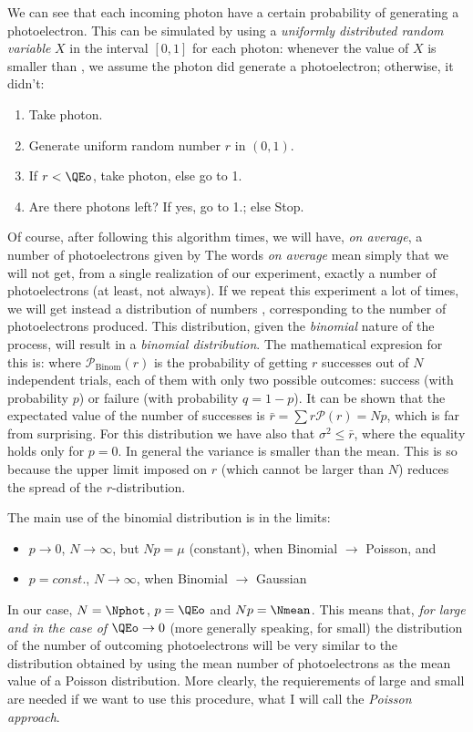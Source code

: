 We can see that each incoming photon have a certain probability \QEo
of generating a photoelectron. This can be simulated by using a
\emph{uniformly distributed random variable} $X$ in the interval
$[0,1]$ for each photon: whenever the value of $X$ is smaller than
\QEo, we assume the photon did generate a photoelectron; otherwise, it
didn't:
%
\begin{enumerate}
\item Take photon.
\item Generate uniform random number $r$ in $(0,1)$.
\item If $r < \QEo$, take photon, else go to 1.
\item Are there photons left? If yes, go to 1.; else Stop.
\end{enumerate}
%
Of course, after following this algorithm \Nphot times, we will have,
\emph{on average}, a number of photoelectrons given by
%
\nmeaneq
%
The words \emph{on average} mean simply that we will not get, from a
single realization of our experiment, exactly a number \Nmean of
photoelectrons (at least, not always). If we repeat this experiment a
lot of times, we will get instead a distribution of numbers \Ntrial,
corresponding to the number of photoelectrons produced. This
distribution, given the \emph{binomial} nature of the process, will
result in a \emph{binomial distribution}. The mathematical expresion
for this is:
%
\binomeq
%
where $\mathcal{P}_{\mathrm{Binom}}(r)$ is the probability of getting
$r$ successes out of $N$ independent trials, each of them with only
two possible outcomes: success (with probability $p$) or failure (with
probability $q=1-p$). It can be shown that the expectated value of the
number of successes is $\bar{r}=\sum r\mathcal{P}(r) = N p$, which is
far from surprising. For this distribution we have also that
$\sigma^{2} \leq \bar{r}$, where the equality holds only for $p=0$. In
general the variance is smaller than the mean. This is so because the
upper limit imposed on $r$ (which cannot be larger than $N$) reduces
the spread of the $r$-distribution.

\noutqesmallfig

\varquotfig

The main use of the binomial distribution is in the limits:
%
\begin{itemize}
\item $p\rightarrow 0$, $N\rightarrow\infty$, but $Np=\mu$ (constant),
  when Binomial $\longrightarrow$ Poisson, and
\item $p=const.$, $N\rightarrow\infty$, when Binomial
  $\longrightarrow$ Gaussian
\end{itemize}
%
In our case, $N=\Nphot$, $p=\QEo$ and $Np=\Nmean$.  This means that,
\emph{for \Nphot large and in the case of $\QEo\rightarrow 0$} (more
generally speaking, for \QEo small) the distribution of the number of
outcoming photoelectrons \Ntrial will be very similar to the
distribution obtained by using the mean number of photoelectrons
\Nmean as the mean value of a Poisson distribution. More clearly, the
requierements of \Nphot large and \QEo small are needed if we want to
use this procedure, what I will call the \emph{Poisson approach}.

